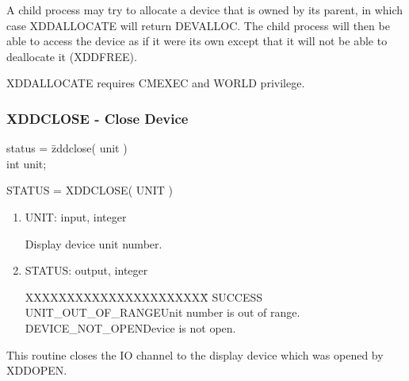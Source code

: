 A child process may try to allocate a device that is owned by its
parent, in which case XDDALLOCATE will return DEVALLOC.  The child
process will then be able to access the device as if it were its own
except that it will not be able to deallocate it (XDDFREE).

XDDALLOCATE requires CMEXEC and WORLD privilege.
\newpage
\subsubsection{XDDCLOSE - Close Device}
\begin{tabbing}
status = \=zddclose( unit )\\
\>int  unit;\\
\end{tabbing}
STATUS = XDDCLOSE( UNIT )
\begin{enumerate}
\item UNIT:  input, integer

Display device unit number.
\item STATUS:  output, integer
\begin{tabbing}
XXXXXXXXXXXXXXXXXXXXXX\=\kill
SUCCESS\\
UNIT\_OUT\_OF\_RANGE\>Unit number is out of range.\\
DEVICE\_NOT\_OPEN\>Device is not open.\\
\end{tabbing}
\end{enumerate}
This routine closes the IO channel to the display device which was opened
by XDDOPEN.
\newpage
